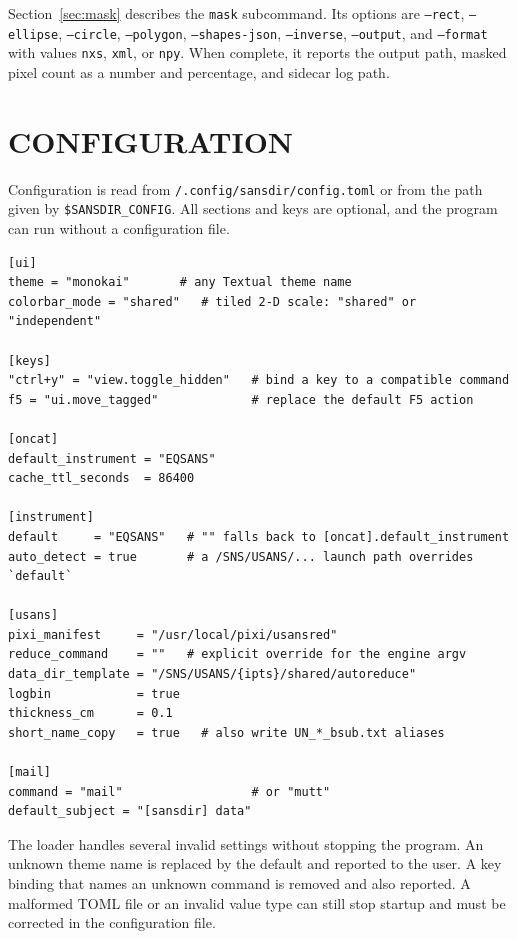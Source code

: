 \documentclass[tm]{ornltm}
\newcommand{\hme}{\raisebox{0.4ex}{\texttildelow}}
\begin{document}
Section~\ref{sec:mask} describes the \texttt{mask} subcommand. Its options
are \texttt{--rect}, \texttt{--ellipse}, \texttt{--circle}, \texttt{--polygon},
\texttt{--shapes-json}, \texttt{--inverse}, \texttt{--output}, and
\texttt{--format} with values \texttt{nxs}, \texttt{xml}, or \texttt{npy}. When
complete, it reports the output path, masked pixel count as a number and
percentage, and sidecar log path.

\section{CONFIGURATION}
\label{sec:config}

Configuration is read from \texttt{\hme/.config/sansdir/config.toml} or from the
path given by \texttt{\$SANSDIR\_CONFIG}. All sections and keys are optional, and
the program can run without a configuration file.

\begin{lstlisting}
[ui]
theme = "monokai"       # any Textual theme name
colorbar_mode = "shared"   # tiled 2-D scale: "shared" or "independent"

[keys]
"ctrl+y" = "view.toggle_hidden"   # bind a key to a compatible command
f5 = "ui.move_tagged"             # replace the default F5 action

[oncat]
default_instrument = "EQSANS"
cache_ttl_seconds  = 86400

[instrument]
default     = "EQSANS"   # "" falls back to [oncat].default_instrument
auto_detect = true       # a /SNS/USANS/... launch path overrides `default`

[usans]
pixi_manifest     = "/usr/local/pixi/usansred"
reduce_command    = ""   # explicit override for the engine argv
data_dir_template = "/SNS/USANS/{ipts}/shared/autoreduce"
logbin            = true
thickness_cm      = 0.1
short_name_copy   = true   # also write UN_*_bsub.txt aliases

[mail]
command = "mail"                  # or "mutt"
default_subject = "[sansdir] data"
\end{lstlisting}

The loader handles several invalid settings without stopping the program. An
unknown theme name is replaced by the default and reported to the user. A key
binding that names an unknown command is removed and also reported. A malformed
TOML file or an invalid value type can still stop startup and must be corrected
in the configuration file.
\end{document}
